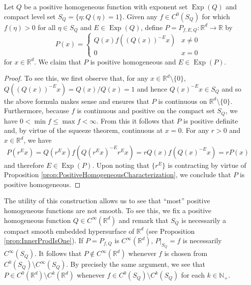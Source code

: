 \documentclass[11pt, letter]{book}
\newenvironment{example}
  {\pushQED{\qed}\renewcommand{\qedsymbol}{$\triangle$}\examplex}
  {\popQED\endexamplex}
\newcommand*{\myproofname}{Proof}
\newenvironment{subproof}[1][\myproofname]{\begin{proof}[#1]\renewcommand*{\qedsymbol}{$\mathbin{/\mkern-6mu/}$}}{\end{proof}}
\newcommand\Exp{\operatorname{Exp}}
\begin{document}
\begin{example}\label{exp:Weierstrass}\normalfont
Let $Q$ be a positive homogeneous function with exponent set $\Exp(Q)$ and compact level set $S_Q=\{\eta:Q(\eta)=1\}$. Given any $f\in C^0(S_Q)$ for which $f(\eta)>0$ for all $\eta\in S_Q$ and $E\in \Exp(Q)$, define $P=P_{f,E,Q}:\mathbb{R}^d\to\mathbb{R}$ by
\begin{equation*}
P(x)=\begin{cases}
Q(x)f\left((Q(x))^{-E}x\right) & x\neq 0\\
0 & x=0
\end{cases}
\end{equation*}
for $x\in\mathbb{R}^d$. We claim that $P$ is positive homogeneous and $E\in\Exp(P)$.

\begin{subproof}To see this, we first observe that, for any $x\in\mathbb{R}^d\setminus \{0\}$, $Q((Q(x))^{-E}x)=Q(x)/Q(x)=1$ and hence $Q(x)^{-E}x\in S_Q$ and so the above formula makes sense and ensures that $P$ is continuous on $\mathbb{R}^d\setminus\{0\}$. Furthermore, because $f$ is continuous and positive on the compact set $S_Q$, we have $0<\min f\leq \max f<\infty$. From this it follows that $P$ is positive definite and, by virtue of the squeeze theorem, continuous at $x=0$. For any $r>0$ and $x\in\mathbb{R}^d$, we have
\begin{equation*}
P(r^Ex)=Q(r^Ex)f(Q(r^Ex)^{-E}r^Ex)=rQ(x)f(Q(x)^{-E}x)=rP(x)
\end{equation*}
and therefore $E\in\Exp(P)$. Upon noting that $\{r^E\}$ is contracting by virtue of Proposition \ref{prop:PositiveHomogeneousCharacterization}, we conclude that $P$ is positive homogeneous.
\end{subproof}
\noindent The utility of this construction allows us to see that ``most'' positive homogeneous functions are not smooth. To see this, we fix a positive homogeneous function $Q\in C^{\infty}(\mathbb{R}^d)$ and remark that $S_Q$ is necessarily a compact smooth embedded hypersurface of $\mathbb{R}^d$ (see Proposition \ref{prop:InnerProdIsOne}). If $P=P_{f,Q}$ is $C^\infty(\mathbb{R}^d)$, $P\vert_{S_Q}=f$ is necessarily $C^\infty(S_Q)$. It follows that $P\notin C^\infty(\mathbb{R}^d)$ whenever $f$ is chosen from $C^0(S_Q)\setminus C^\infty(S_Q)$. By precisely the same argument, we see that $P\in C^0(\mathbb{R}^d)\setminus C^k(\mathbb{R}^d)$ whenever $f\in C^0(S_Q)\setminus C^k(S_Q)$ for each $k\in\mathbb{N}_+$.\\


\end{example}
\end{document}
